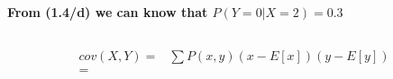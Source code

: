 \documentclass{article}
\begin{document}
        \subsection{}
            \paragraph{
                From (1.4/d) we can know that
                $P(Y=0|X=2)=0.3$
            }
        \subsection{}
            \paragraph{
                \begin{equation*}
                    \begin{split}
                        cov(X,Y)=&\sum P(x,y)(x-E[x])(y-E[y])\\
                            =&
                    \end{split}
                \end{equation*}
            }
\end{document}
